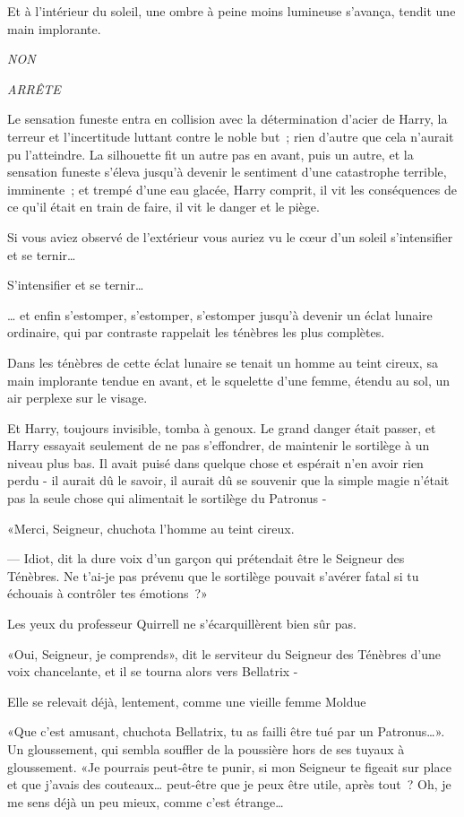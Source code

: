 Et à l'intérieur du soleil, une ombre à peine moins lumineuse s'avança, tendit une main implorante.

\emph{NON}

\emph{ARRÊTE}

Le sensation funeste entra en collision avec la détermination d'acier de Harry, la terreur et l'incertitude luttant contre le noble but~; rien d'autre que cela n'aurait pu l'atteindre. La silhouette fit un autre pas en avant, puis un autre, et la sensation funeste s'éleva jusqu'à devenir le sentiment d'une catastrophe terrible, imminente~; et trempé d'une eau glacée, Harry comprit, il vit les conséquences de ce qu'il était en train de faire, il vit le danger et le piège.

Si vous aviez observé de l'extérieur vous auriez vu le cœur d'un soleil s'intensifier et se ternir…

S'intensifier et se ternir…

… et enfin s'estomper, s'estomper, s'estomper jusqu'à devenir un éclat lunaire ordinaire, qui par contraste rappelait les ténèbres les plus complètes.

Dans les ténèbres de cette éclat lunaire se tenait un homme au teint cireux, sa main implorante tendue en avant, et le squelette d'une femme, étendu au sol, un air perplexe sur le visage.

Et Harry, toujours invisible, tomba à genoux. Le grand danger était passer, et Harry essayait seulement de ne pas s'effondrer, de maintenir le sortilège à un niveau plus bas. Il avait puisé dans quelque chose et espérait n'en avoir rien perdu - il aurait dû le savoir, il aurait dû se souvenir que la simple magie n'était pas la seule chose qui alimentait le sortilège du Patronus -

«Merci, Seigneur, chuchota l'homme au teint cireux.

--- Idiot, dit la dure voix d'un garçon qui prétendait être le Seigneur des Ténèbres. Ne t'ai-je pas prévenu que le sortilège pouvait s'avérer fatal si tu échouais à contrôler tes émotions~?»

Les yeux du professeur Quirrell ne s'écarquillèrent bien sûr pas.

«Oui, Seigneur, je comprends», dit le serviteur du Seigneur des Ténèbres d'une voix chancelante, et il se tourna alors vers Bellatrix -

Elle se relevait déjà, lentement, comme une vieille femme Moldue

 «Que c'est amusant, chuchota Bellatrix, tu as failli être tué par un Patronus…». Un gloussement, qui sembla souffler de la poussière hors de ses tuyaux à gloussement. «Je pourrais peut-être te punir, si mon Seigneur te figeait sur place et que j'avais des couteaux… peut-être que je peux être utile, après tout~? Oh, je me sens déjà un peu mieux, comme c'est étrange…

